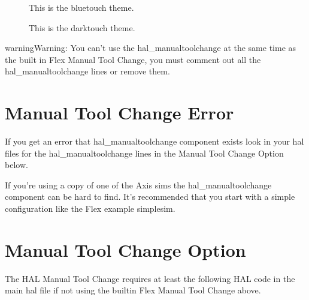 \documentclass[letterpaper,10pt,english]{sphinxmanual}
\begin{document}
\begin{figure}[htbp]
\centering
\capstart

\noindent{}
\caption{This is the blue\sphinxhyphen{}touch theme.}\label{\detokenize{tools:id3}}\end{figure}

\begin{figure}[htbp]
\centering
\capstart

\noindent{}
\caption{This is the dark\sphinxhyphen{}touch theme.}\label{\detokenize{tools:id4}}\end{figure}

\begin{sphinxadmonition}{warning}{Warning:}
\sphinxAtStartPar
You can’t use the hal\_manualtoolchange at the same time as the
built in Flex Manual Tool Change, you must comment out all the
hal\_manualtoolchange lines or remove them.
\end{sphinxadmonition}


\section{Manual Tool Change Error}
\label{\detokenize{tools:manual-tool-change-error}}
\sphinxAtStartPar
If you get an error that hal\_manualtoolchange component exists look in your hal
files for the hal\_manualtoolchange lines in the Manual Tool Change Option below.

\sphinxAtStartPar
If you’re using a copy of one of the Axis sims the hal\_manualtoolchange
component can be hard to find. It’s recommended that you start with a simple
configuration like the Flex example simple\sphinxhyphen{}sim.


\section{Manual Tool Change Option}
\label{\detokenize{tools:manual-tool-change-option}}
\sphinxAtStartPar
The HAL Manual Tool Change requires at least the following HAL code in the main
hal file if not using the builtin Flex Manual Tool Change above.
\end{document}
